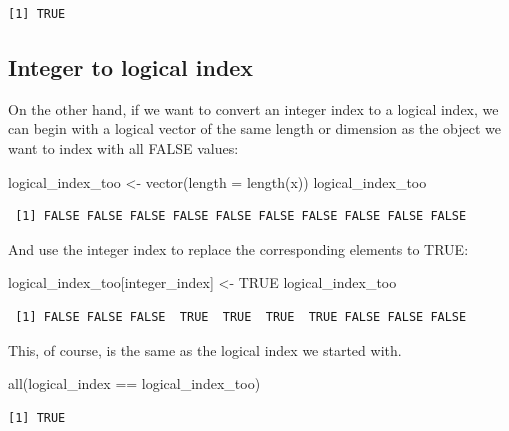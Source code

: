 \documentclass[
]{book}
\newenvironment{Shaded}{\begin{snugshade}}{\end{snugshade}}
\newcommand{\AttributeTok}[1]{\textcolor[rgb]{0.77,0.63,0.00}{#1}}
\newcommand{\ConstantTok}[1]{\textcolor[rgb]{0.00,0.00,0.00}{#1}}
\newcommand{\FunctionTok}[1]{\textcolor[rgb]{0.00,0.00,0.00}{#1}}
\newcommand{\NormalTok}[1]{#1}
\newcommand{\OtherTok}[1]{\textcolor[rgb]{0.56,0.35,0.01}{#1}}
\newcommand{\SpecialCharTok}[1]{\textcolor[rgb]{0.00,0.00,0.00}{#1}}
\begin{document}
\begin{verbatim}
[1] TRUE
\end{verbatim}

\hypertarget{integer-to-logical-index}{%
\subsection{Integer to logical index}\label{integer-to-logical-index}}

On the other hand, if we want to convert an integer index to a logical index, we can begin with a logical vector of the same length or dimension as the object we want to index with all FALSE values:

\begin{Shaded}
\begin{Highlighting}[]
\NormalTok{logical\_index\_too }\OtherTok{\textless{}{-}} \FunctionTok{vector}\NormalTok{(}\AttributeTok{length =} \FunctionTok{length}\NormalTok{(x))}
\NormalTok{logical\_index\_too}
\end{Highlighting}
\end{Shaded}

\begin{verbatim}
 [1] FALSE FALSE FALSE FALSE FALSE FALSE FALSE FALSE FALSE FALSE
\end{verbatim}

And use the integer index to replace the corresponding elements to TRUE:

\begin{Shaded}
\begin{Highlighting}[]
\NormalTok{logical\_index\_too[integer\_index] }\OtherTok{\textless{}{-}} \ConstantTok{TRUE}
\NormalTok{logical\_index\_too}
\end{Highlighting}
\end{Shaded}

\begin{verbatim}
 [1] FALSE FALSE FALSE  TRUE  TRUE  TRUE  TRUE FALSE FALSE FALSE
\end{verbatim}

This, of course, is the same as the logical index we started with.

\begin{Shaded}
\begin{Highlighting}[]
\FunctionTok{all}\NormalTok{(logical\_index }\SpecialCharTok{==}\NormalTok{ logical\_index\_too)}
\end{Highlighting}
\end{Shaded}

\begin{verbatim}
[1] TRUE
\end{verbatim}
\end{document}
